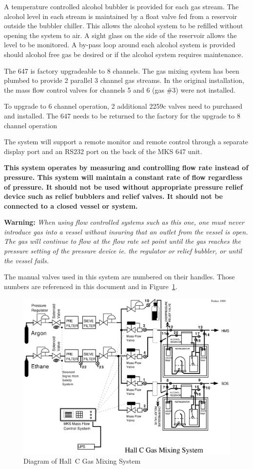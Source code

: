 A temperature controlled alcohol bubbler is provided for each gas
stream.  The alcohol level in each stream is maintained by a float valve
fed from a reservoir outside the bubbler chiller. This allows the alcohol
system to be refilled without opening the system to air.  A sight glass on
the side of the reservoir allows the level to be monitored.  A by-pass loop
around each alcohol system is provided should alcohol free gas be desired
or if the alcohol system requires maintenance.

The 647 is factory upgradeable to 8 channels.  The gas mixing
system has been plumbed to provide 2 parallel 3 channel gas streams.  In
the original installation, the mass flow control valves for channels 5 and
6 (gas \#3) were not installed.

To upgrade to 6 channel operation, 2 additional 2259c valves need
to purchased and installed.  The 647 needs to be returned to the factory
for the upgrade to 8 channel operation

The system will support a remote monitor and remote control through
a separate display port and an RS232 port on the back of the MKS 647 unit.

{\bf This system operates by measuring and controlling flow rate instead
of pressure. This system will maintain a constant rate of flow
regardless of pressure. It should not be used without appropriate pressure
relief device such as relief bubblers and relief valves. It should not be
connected to a closed vessel or system.}

{\bf Warning:} {\em{When using flow controlled systems such as this one, one 
must never introduce gas into a vessel without insuring that an outlet from the vessel is 
open.  The gas will continue to flow at the flow rate set point until the gas 
reaches the pressure setting of the pressure device ie. the regulator or relief 
bubbler, or until the vessel fails}.}

The manual valves used in this system are numbered on their
handles.  Those numbers are referenced in this document and in
Figure~\ref{fig:gas_mix}.
\begin{figure}
\includegraphics[width=6in,bb=12 12 750 590]{HallCGasMixlvl1.eps}
\caption{Diagram of Hall~C Gas Mixing System\label{fig:gas_mix}}
\end{figure}

